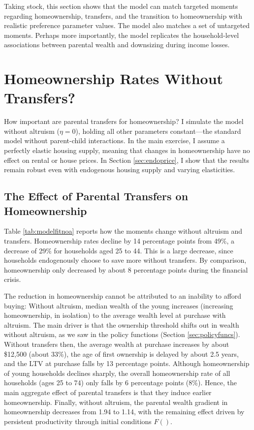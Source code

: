 \documentclass[12pt]{article}
\begin{document}
Taking stock, this section shows that the model can match targeted moments regarding homeownership, transfers, and the transition to homeownership with realistic preference parameter values. The model also matches a set of untargeted moments. Perhaps more importantly, the model replicates the household-level associations between parental wealth and downsizing during income losses. 



\section{Homeownership Rates Without Transfers?}\label{sec:quant}
How important are parental transfers for homeownership? I simulate the model without altruism ($\eta=0$), holding all other parameters constant---the standard model without parent-child interactions. In the main exercise, I assume a perfectly elastic housing supply, meaning that changes in homeownership have no effect on rental or house prices. In Section \ref{sec:endoprice}, I show that the results remain robust even with endogenous housing supply and varying elasticities.

\subsection{The Effect of Parental Transfers on Homeownership}
Table \ref{tab:modelfitnoa} reports how the moments change without altruism and transfers. Homeownership rates decline by 14 percentage points from 49\%, a decrease of 29\% for households aged 25 to 44. This is a large decrease, since households endogenously choose to save more without transfers. By comparison, homeownership only decreased by about 8 percentage points during the financial crisis.

The reduction in homeownership cannot be attributed to an inability to afford buying: Without altruism, median wealth of the young increases (increasing homeownership, in isolation) to the average wealth level at purchase with altruism. The main driver is that the ownership threshold shifts out in wealth without altruism, as we saw in the policy functions (Section \ref{sec:policyfuncs}). Without transfers then, the average wealth at purchase increases by about \$12,500 (about 33\%), the age of first ownership is delayed by about 2.5 years, and the LTV at purchase falls by 13 percentage points. Although homeownership of young households declines sharply, the overall homeownership rate of all households (ages 25 to 74) only falls by 6 percentage points (8\%). Hence, the main aggregate effect of parental transfers is that they induce earlier homeownership. Finally, without altruism, the parental wealth gradient in homeownership decreases from 1.94 to 1.14, with the remaining effect driven by persistent productivity through initial conditions $F()$.
\end{document}
